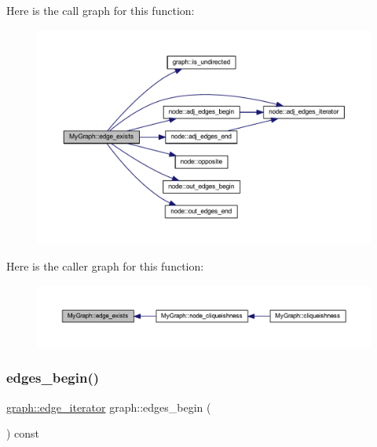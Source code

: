 Here is the call graph for this function\+:\nopagebreak
\begin{figure}[H]
\begin{center}
\leavevmode
\includegraphics[width=350pt]{class_my_graph_a67910a9535e93bc6dcf53e961760b6da_cgraph}
\end{center}
\end{figure}
Here is the caller graph for this function\+:\nopagebreak
\begin{figure}[H]
\begin{center}
\leavevmode
\includegraphics[width=350pt]{class_my_graph_a67910a9535e93bc6dcf53e961760b6da_icgraph}
\end{center}
\end{figure}
\mbox{\label{classgraph_a7ba35a4c4e8343ffb27ed6d9703c6f18}} 
\subsubsection{\texorpdfstring{edges\+\_\+begin()}{edges\_begin()}}
{\footnotesize\ttfamily \mbox{\hyperlink{classgraph_a818d3766018eb0af91d520ce2150203c}{graph\+::edge\+\_\+iterator}} graph\+::edges\+\_\+begin (\begin{DoxyParamCaption}{ }\end{DoxyParamCaption}) const\hspace{0.3cm}{\ttfamily [inherited]}}

